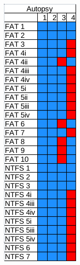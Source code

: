 \begin{figure}

    \begin{subfigure}{0.16\linewidth}
        \includegraphics[width=\linewidth]{fig/autopsy_results.png}

\end{subfigure}
\end{figure}
